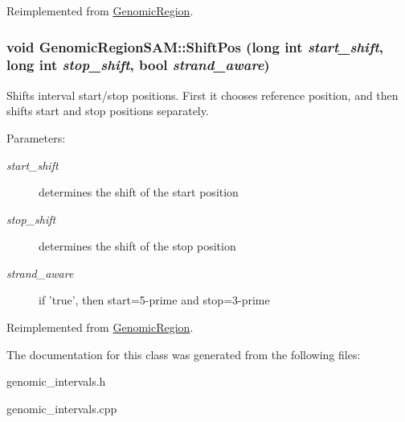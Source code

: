 Reimplemented from \hyperlink{classGenomicRegion_0721b07af0850057e4ab9cd416ecac2f}{GenomicRegion}.\hypertarget{classGenomicRegionSAM_fb2701ba1a521ae2c07ea0ace2f9ee77}{
\subsubsection[ShiftPos]{\setlength{\rightskip}{0pt plus 5cm}void GenomicRegionSAM::ShiftPos (long int {\em start\_\-shift}, \/  long int {\em stop\_\-shift}, \/  bool {\em strand\_\-aware})}}
\label{classGenomicRegionSAM_fb2701ba1a521ae2c07ea0ace2f9ee77}


Shifts interval start/stop positions. First it chooses reference position, and then shifts start and stop positions separately. 

\begin{Desc}
\item[Parameters:]
\begin{description}
\item[{\em start\_\-shift}]determines the shift of the start position \item[{\em stop\_\-shift}]determines the shift of the stop position \item[{\em strand\_\-aware}]if 'true', then start=5-prime and stop=3-prime \end{description}
\end{Desc}


Reimplemented from \hyperlink{classGenomicRegion_0ee8c165839c79afdc586f8b5e07788e}{GenomicRegion}.

The documentation for this class was generated from the following files:\begin{CompactItemize}
\item 
genomic\_\-intervals.h\item 
genomic\_\-intervals.cpp\end{CompactItemize}
